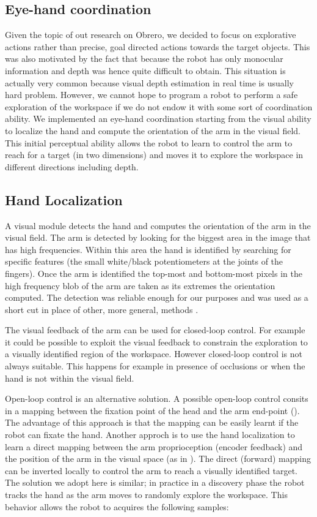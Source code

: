 \subsection{Eye-hand coordination}
Given the topic of out research on Obrero, we decided to focus on explorative 
actions rather than precise, goal directed actions towards the target objects.
This was also motivated by the fact that because the robot has only monocular 
information and depth was hence quite difficult to obtain. This situation is 
actually very common because visual depth estimation in real time is usually 
 hard problem.
However, we cannot hope to program a robot to perform a safe exploration 
of the workspace if we do not endow it with some sort of coordination ability.
We implemented an eye-hand coordination starting from the visual ability to 
localize the hand and compute the orientation of the arm in the visual field. 
This initial perceptual ability allows the robot to learn to control the arm 
to reach for a target (in two dimensions) and moves it to explore the workspace
in different directions including depth.

\subsection{Hand Localization}
A visual module detects the hand and computes the orientation of 
the arm in the visual field. The arm is detected by looking for the 
biggest area in the image that has high frequencies. 
Within this area the hand is identified by searching for 
specific features (the small white/black potentiometers at the joints 
of the fingers). Once the arm is identified the top-most 
and bottom-most pixels in the high frequency blob of the arm 
are taken as its extremes the orientation computed.
The detection was reliable enough for our purposes and was used as a 
short cut in place of other, more general, methods \cite{metta03early}\cite{natale05from}.

The visual feedback of the arm can be used for closed-loop control. For 
example it could be possible to exploit the visual feedback to constrain 
the exploration to a visually identified region of the workspace. However 
closed-loop control is not always suitable. This happens for example 
in presence of occlusions or when the hand is not within the visual field. 

Open-loop control is an alternative solution. A possible open-loop control 
consits in a mapping between the fixation point of the head and the arm 
end-point (\cite{metta00Babybot}). The advantage of this approach is that the mapping 
can be easily learnt if the robot can fixate the hand. Another approch is to
use the hand localization to learn a direct mapping between the arm 
proprioception (encoder feedback) and the position of the arm in the visual 
space (as in \cite{natale05from}). The direct (forward) mapping can be inverted 
locally to control the arm to reach a visually identified target. The 
solution we adopt here is similar; in practice in a discovery phase the robot
tracks the hand as the arm moves to randomly explore the workspace.
This behavior allows the robot to acquires the following samples:

